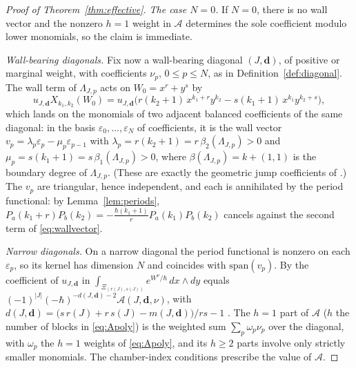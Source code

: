 \documentclass[11pt]{amsart}
\theoremstyle{definition}
\theoremstyle{remark}
\newcommand{\Ascr}{\mathcal{A}}
\begin{document}
\begin{proof}[Proof of Theorem~\ref{thm:effective}]
\emph{The case $N=0$.}
If $N=0$, there is no wall vector and the nonzero $h=1$ weight in
$\Ascr$ determines the sole coefficient modulo lower monomials, so the claim is
immediate.

\emph{Wall-bearing diagonals.}
Fix now a wall-bearing diagonal $(J,\mathbf d)$, of positive or
marginal weight, with coefficients $\nu_{p}$, $0\le p\le N$, as in
Definition~\ref{def:diagonal}. The wall term of
$\Lambda_{J,p}$ acts on $W_{0}=x^{r}+y^{s}$ by
\begin{equation}
\label{eq:wallvector}
u_{J,\mathbf d}X_{k_{1},k_{2}}(W_{0})
=u_{J,\mathbf d}\bigl(r(k_{2}{+}1)\,x^{k_{1}+r}y^{k_{2}}
-s(k_{1}{+}1)\,x^{k_{1}}y^{k_{2}+s}\bigr),
\end{equation}
which lands on the monomials of two adjacent balanced coefficients of the same
diagonal: in the basis
$\varepsilon_{0},\dots,\varepsilon_{N}$ of coefficients, it is the wall vector
$v_{p}=\lambda_{p}\varepsilon_{p}-\mu_{p}\varepsilon_{p-1}$ with
$\lambda_{p}=r(k_{2}{+}1)=r\,\beta_{2}(\Lambda_{J,p})>0$ and
$\mu_{p}=s(k_{1}{+}1)=s\,\beta_{1}(\Lambda_{J,p})>0$, where
$\beta(\Lambda_{J,p})=k+(1,1)$ is the boundary degree of $\Lambda_{J,p}$.
(These are exactly the geometric jump coefficients of \cite[(5.52)--(5.54)]{GKT}.) The $v_{p}$ are triangular, hence
independent, and each is annihilated by the period functional: by
Lemma~\ref{lem:periods}, $P_{a}(k_{1}{+}r)P_{b}(k_{2})
=-\tfrac{\hbar(k_{1}+1)}{r}P_{a}(k_{1})P_{b}(k_{2})$ cancels against the second
term of \eqref{eq:wallvector}.

\emph{Narrow diagonals.}
On a narrow diagonal the period functional is nonzero on each $\varepsilon_{p}$, so its kernel has
dimension $N$ and coincides with $\mathrm{span}(v_{p})$. By
\cite[Thm.~4.9]{GKT} the coefficient of $u_{J,\mathbf d}$ in
$\int_{\Xi_{(r(J),s(J))}}e^{W^{\nu}/\hbar}\,dx\wedge dy$ equals
$(-1)^{|J|}(-\hbar)^{-d(J,\mathbf d)-2}\Ascr(J,\mathbf d,\nu)$, with
$d(J,\mathbf d)=\bigl(s\,r(J)+r\,s(J)-m(J,\mathbf d)\bigr)/rs-1$
\cite[Def.~4.8]{GKT}.  The $h=1$ part of $\Ascr$
($h$ the number of blocks in \eqref{eq:Apoly}) is
the weighted sum $\sum_{p}\omega_{p}\nu_{p}$ over the diagonal, with
$\omega_p$ the $h=1$ weights of \eqref{eq:Apoly}, and its
$h\ge2$ parts involve only strictly smaller monomials. The chamber-index
conditions \cite[Def.~3.47]{GKT} prescribe the value of $\Ascr$.


\end{proof}
\end{document}
